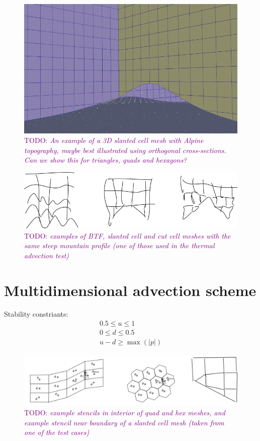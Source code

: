 \documentclass{article}
\newcommand{\TODO}[1]{\textcolor{purple}{TODO: \emph{#1}}}
\begin{document}
\begin{figure}
	\includegraphics[width=\textwidth]{3dslices.png}
	\caption{\TODO{An example of a 3D slanted cell mesh with Alpine topography, maybe best illustrated using orthogonal cross-sections.  Can we show this for triangles, quads and hexagons?}}
\end{figure}

\begin{figure}
	\includegraphics[width=\textwidth]{meshComparison.png}
	\caption{\TODO{examples of BTF, slanted cell and cut cell meshes with the same steep mountain profile (one of those used in the thermal advection test)}}
\end{figure}

\section{Multidimensional advection scheme}

Stability constriants:
\begin{align}
	0.5 \leq u \leq 1 \\
	0 \leq d \leq 0.5 \\
	u - d \geq \max(|p|)
\end{align}

\begin{figure}
	\includegraphics[width=\textwidth]{stencilConstruction.png}
	\caption{\TODO{example stencils in interior of quad and hex meshes, and example stencil near boundary of a slanted cell mesh (taken from one of the test cases)}}
\end{figure}
\end{document}
